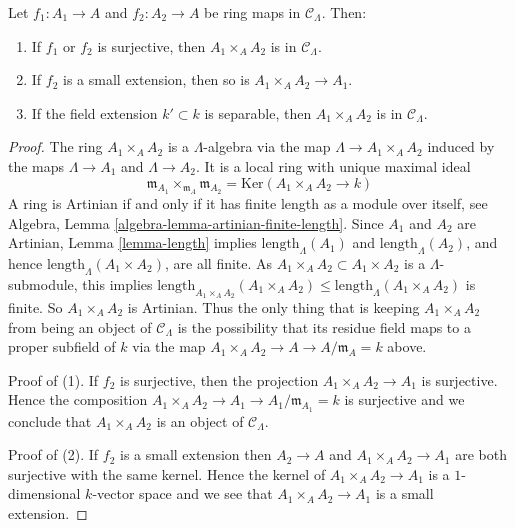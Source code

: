 \begin{lemma}
\label{lemma-fiber-product-CLambda}
Let $f_1 : A_1 \to A$ and $f_2 : A_2 \to A$ be ring maps in 
$\mathcal{C}_\Lambda$. Then:
\begin{enumerate}
\item If $f_1$ or $f_2$ is surjective, then
$A_1 \times_A A_2$ is in $\mathcal{C}_\Lambda$.
\item If $f_2$ is a small extension, then so is
$A_1 \times_A A_2 \to A_1$.
\item If the field extension $k' \subset k$ is separable, then
$A_1 \times_A A_2$ is in $\mathcal{C}_\Lambda$.
\end{enumerate}
\end{lemma}

\begin{proof}
The ring $A_1 \times_A A_2$ is a $\Lambda$-algebra via  the map
$\Lambda \to A_1 \times_A A_2$ induced by the maps
$\Lambda \to A_1$ and $\Lambda \to A_2$. It is a local ring with unique
maximal ideal
$$
\mathfrak m_{A_1} \times_{\mathfrak m_A} \mathfrak m_{A_2} =
\text{Ker}(A_1 \times_A A_2 \longrightarrow k)
$$
A ring is Artinian if and only if it has finite length as a module
over itself, see
Algebra, Lemma \ref{algebra-lemma-artinian-finite-length}.
Since $A_1$ and $A_2$ are Artinian, Lemma \ref{lemma-length} implies 
$\text{length}_\Lambda(A_1)$ and $\text{length}_\Lambda(A_2)$, 
and hence $\text{length}_\Lambda(A_1 \times A_2)$, are all finite.  As 
$A_1 \times_A A_2 \subset A_1 \times A_2$ is a $\Lambda$-submodule, this 
implies
$\text{length}_{A_1 \times_A A_2}(A_1 \times_A A_2) \leq
\text{length}_\Lambda(A_1 \times_A A_2)$ is finite. So $A_1 
\times_{A} A_2$ is Artinian. Thus the only thing that is keeping
$A_1 \times_A A_2$ from being an object of $\mathcal{C}_\Lambda$ is
the possibility that its residue field maps to a proper subfield of $k$
via the map $A_1 \times_A A_2 \to A \to A/\mathfrak m_A = k$ above.

\medskip \noindent
Proof of (1). If $f_2$ is surjective, then the projection
$A_1 \times_A A_2 \to A_1$ is surjective. Hence the composition
$A_1 \times_A A_2 \to A_1 \to A_1/\mathfrak m_{A_1} = k$ is surjective
and we conclude that $A_1 \times_A A_2$ is an object of $\mathcal{C}_\Lambda$.

\medskip\noindent
Proof of (2). If $f_2$ is a small extension then $A_2 \to A$ and
$A_1 \times_A A_2  \to A_1$ are both surjective with the same kernel.
Hence the kernel of $A_1 \times_A A_2  \to A_1$ is a $1$-dimensional
$k$-vector space and we see that $A_1 \times_A A_2  \to A_1$ is a small
extension.


\end{proof}
